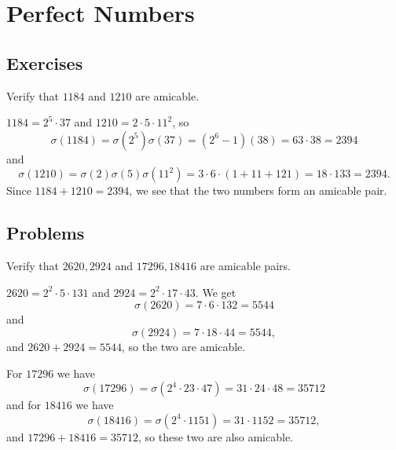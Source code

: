 \chapter{Perfect Numbers}

\section{Exercises}

 Verify that $1184$ and $1210$ are amicable.
\begin{solution}
  $1184 = 2^5\cdot37$ and $1210 = 2\cdot5\cdot11^2$, so
  \begin{equation*}
    \sigma(1184) = \sigma(2^5)\sigma(37)
    = (2^6 - 1)(38) = 63\cdot38 = 2394
  \end{equation*}
  and
  \begin{equation*}
    \sigma(1210) = \sigma(2)\sigma(5)\sigma(11^2)
    = 3\cdot6\cdot(1 + 11 + 121) = 18\cdot133
    = 2394.
  \end{equation*}
  Since $1184 + 1210 = 2394$, we see that the two numbers form an
  amicable pair.
\end{solution}

\section{Problems}

 Verify that $2620, 2924$ and $17296,18416$ are amicable pairs.
\begin{solution}
  $2620 = 2^2\cdot5\cdot131$ and $2924 = 2^2\cdot17\cdot43$. We get
  \begin{equation*}
    \sigma(2620) = 7\cdot6\cdot132 = 5544
  \end{equation*}
  and
  \begin{equation*}
    \sigma(2924) = 7\cdot18\cdot44 = 5544,
  \end{equation*}
  and $2620 + 2924 = 5544$, so the two are amicable.

  For $17296$ we have
  \begin{equation*}
    \sigma(17296) = \sigma(2^4\cdot23\cdot47)
    = 31\cdot24\cdot48 = 35712
  \end{equation*}
  and for $18416$ we have
  \begin{equation*}
    \sigma(18416) = \sigma(2^4\cdot1151)
    = 31\cdot1152 = 35712,
  \end{equation*}
  and $17296 + 18416 = 35712$, so these two are also amicable.
\end{solution}
